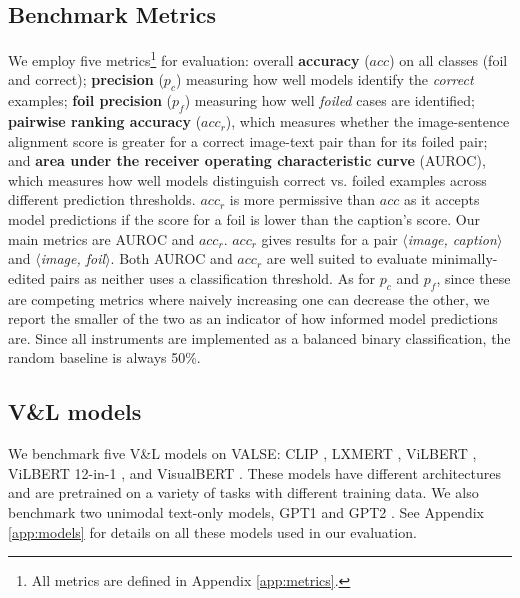 \documentclass[11pt]{article}
\begin{document}
\subsection{Benchmark Metrics} \label{subsec:metrics}
We employ five metrics\footnote{All metrics are defined in Appendix \ref{app:metrics}.} for evaluation:
overall {\bf accuracy} ($acc$) on all classes (foil and correct);
{\bf precision} ($p_c$) measuring how well models identify the \emph{correct} examples; {\bf foil precision} ($p_f$) measuring how well \emph{foiled} cases are identified;
{\bf pairwise ranking accuracy} ($acc_r$), which measures whether the image-sentence alignment score is greater for a correct image-text pair than for its foiled pair;
and
{\bf area under the receiver operating characteristic curve} (AUROC), which measures how well models distinguish correct vs. foiled examples across different prediction thresholds.
$acc_r$ is more permissive than $acc$ as it accepts model predictions if the score for a foil is lower than the caption's score.
Our main metrics are AUROC and $acc_r$. $acc_r$ gives results for a pair \textit{$\langle$image, caption$\rangle$} and \textit{$\langle$image, foil$\rangle$}. Both AUROC and $acc_r$ are well suited to evaluate minimally-edited pairs as neither uses a classification threshold. 
As for $p_c$ and $p_f$, since these are competing metrics where naively increasing one can decrease the other, we report the smaller of the two as an indicator of how informed model predictions are.
Since all instruments are implemented as a balanced binary classification, the random baseline is always 50\%.

\subsection{V\&L models}\label{subsec:vl_models}

We benchmark five V\&L models on VALSE: CLIP \citep{radford2021learning}, LXMERT \citep{tan-bansal-2019-lxmert}, ViLBERT \citep{lu2019vilbert}, ViLBERT 12-in-1 \citep{lu2020vilbert12in1}, and VisualBERT \citep{li2019visualbert}. These models have different architectures and are pretrained on a variety of tasks
with
different training data. We also benchmark two unimodal text-only models, GPT1 \citep{radford2018improving} and GPT2 \citep{radford2019language}. 
See Appendix \ref{app:models} for details on all these models used in our evaluation.
\end{document}
